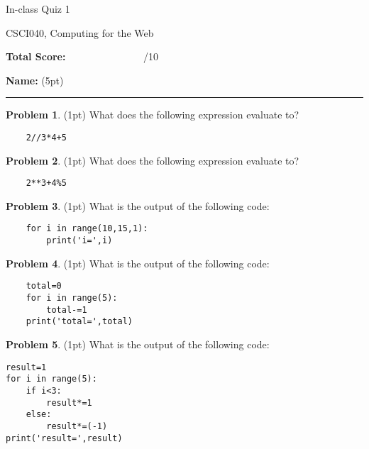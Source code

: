 \documentclass[10pt]{article}
\theoremstyle{definition}
\newtheorem{problem}{Problem}
\begin{document}
\begin{center}
    {
\Large
In-class Quiz 1
}

    \vspace{0.1in}
CSCI040, Computing for the Web

    \vspace{0.1in}
\end{center}

\vspace{0.25in}
\noindent
\textbf{Total Score:} ~~~~~~~~~~~~~~~/10

\vspace{0.5in}
\noindent
\textbf{Name:} (5pt)

\noindent
\rule{\textwidth}{0.1pt}
\vspace{0.25in}

\begin{problem}
    (1pt)
    What does the following expression evaluate to?
\end{problem}
\begin{lstlisting}
    2//3*4+5
\end{lstlisting}
\vspace{1.5in}

\begin{problem}
    (1pt)
    What does the following expression evaluate to?
\end{problem}
\begin{lstlisting}
    2**3+4%5
\end{lstlisting}
\vspace{1.5in}

\begin{problem}
    (1pt)
    What is the output of the following code:
\end{problem}
\begin{lstlisting}
    for i in range(10,15,1):
        print('i=',i)
\end{lstlisting}
\vspace{2in}

\begin{problem}
    (1pt)
    What is the output of the following code:
\end{problem}
\begin{lstlisting}
    total=0
    for i in range(5):
        total-=1
    print('total=',total)
\end{lstlisting}
\vspace{2in}

\begin{problem}
    (1pt)
    What is the output of the following code:
\end{problem}
\begin{lstlisting}
result=1
for i in range(5):
    if i<3:
        result*=1
    else:
        result*=(-1)
print('result=',result)
\end{lstlisting}
\end{document}

